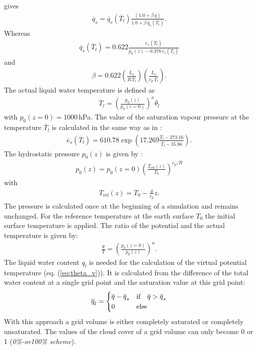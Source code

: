 \documentclass[11pt,a4paper]{scrartcl}
\begin{document}
gives
\begin{eqnarray}
  \overline q_{s} = \overline q_{s}(\overline T_{l})\frac{\left(1.0+\beta\,\overline q\right)}
    {1.0 + \beta\, \overline q_{s}(\overline{T_{l}})}.
 \label{eq:qs2}
\end{eqnarray}
Whereas
\begin{eqnarray}
  \overline q_{s}(\overline T_{l}) = 0.622\frac{\overline e_{s}(\overline T_{l})}
    {p_{0}(z)-0.378\,\overline e_{s}(\overline T_{l})}
 \label{eq:qs3}
\end{eqnarray}
and
\begin{eqnarray}
 \beta = 0.622\left(\frac{L_{v}}{R\,\overline T_{l}}\right) \left(\frac{L_{v}}{c_{p}\,\overline T_{l}}\right).
 \label{eq:beta}
\end{eqnarray}
The actual liquid water temperature is defined as 
\begin{eqnarray}
 \overline T_{l} = \left(\frac{p_{0}(z)}{p_{0}(z=0)}\right)^{\kappa} \overline\theta_{l}
 \label{eq:T_l}
\end{eqnarray}
with $p_{0}(z=0) = 1000$\,hPa. The value of the saturation vapour pressure at the temperature $\overline T_{l}$ is 
calculated in the same way as in \cite{bougeault82}:
\begin{eqnarray}
 \overline e_{s}(\overline T_{l}) = 610.78 \exp\left(
  17.269\frac{\overline T_{l}-273.16}{\overline T_{l}-35.86}\right).
 \label{eq:es}
\end{eqnarray}
The hydrostatic pressure $p_{0}(z)$ is given by \cite{cuijpers93}:
\begin{eqnarray}
 p_{0}(z) = p_{0}(z=0)\left(\frac{T_{\mathrm{ref}}(z)}{T_{0}}\right)^{c_{p}/R}
 \label{eq:p_0}
\end{eqnarray}
with
\begin{eqnarray}
 T_{\mathrm{ref}}(z) = T_{0} - \frac{g}{c_{p}} z.
 \label{eq:T_ref}
\end{eqnarray}
The pressure is calculated once at the beginning of a simulation and remains unchanged. For the reference temperature at the earth surface $T_{0}$ 
the initial surface temperature is applied. The ratio of the potential and the actual temperature is given by:
\begin{eqnarray}
 \frac{\theta}{T} = \left(\frac{p_{0}(z=0)}{p_{0}(z)}\right)^{\kappa}.
 \label{eq:ratio}
\end{eqnarray}
The liquid water content $q_{l}$ is needed for the calculation of the virtual potential temperature (eq. (\ref{eq:theta_v})). It is 
calculated from the difference of the total water content at a single grid point and the saturation value at this grid point:
\begin{eqnarray}
 \overline q_{l} = 
 \begin{cases}
   \overline q - \overline q_{s} & 
   \textnormal{if} \quad \overline q > \overline q_{s} \\
   0  & \textnormal{else}
  \end{cases}
 \label{eq:q_l}
\end{eqnarray}
With this approach a grid volume is either completely saturated or completely unsaturated. The values of the cloud cover of a grid volume 
can only become 0 or 1 (\textsl{0\%-or100\% scheme}).
\end{document}
